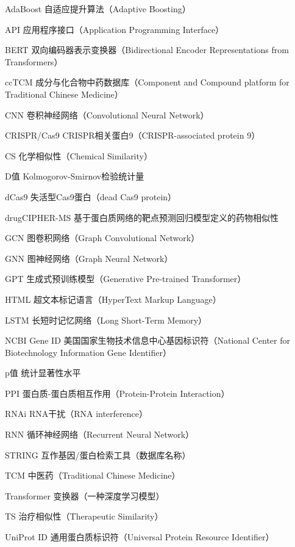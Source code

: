 
\begin{denotation}[3cm]
  \item[AdaBoost]{自适应提升算法（Adaptive Boosting）}
  \item[API]{应用程序接口（Application Programming Interface）}
  \item[BERT]{双向编码器表示变换器（Bidirectional Encoder Representations from Transformers）}
  \item[ccTCM]{成分与化合物中药数据库（Component and Compound platform for Traditional Chinese Medicine）}
  \item[CNN]{卷积神经网络（Convolutional Neural Network）}
  \item[CRISPR/Cas9]{CRISPR相关蛋白9（CRISPR-associated protein 9）}
  \item[CS]{化学相似性（Chemical Similarity）}
  \item[D值]{Kolmogorov-Smirnov检验统计量}
  \item[dCas9]{失活型Cas9蛋白（dead Cas9 protein）}
  \item[drugCIPHER-MS]{基于蛋白质网络的靶点预测回归模型定义的药物相似性}
  \item[GCN]{图卷积网络（Graph Convolutional Network）}
  \item[GNN]{图神经网络（Graph Neural Network）}
  \item[GPT]{生成式预训练模型（Generative Pre-trained Transformer）}
  \item[HTML]{超文本标记语言（HyperText Markup Language）}
  \item[LSTM]{长短时记忆网络（Long Short-Term Memory）}
  \item[NCBI Gene ID]{美国国家生物技术信息中心基因标识符（National Center for Biotechnology Information Gene Identifier）}
  \item[p值]{统计显著性水平}
  \item[PPI]{蛋白质-蛋白质相互作用（Protein-Protein Interaction）}
  \item[RNAi]{RNA干扰（RNA interference）}
  \item[RNN]{循环神经网络（Recurrent Neural Network）}
  \item[STRING]{互作基因/蛋白检索工具（数据库名称）}
  \item[TCM]{中医药（Traditional Chinese Medicine）}
  \item[Transformer]{变换器（一种深度学习模型）}
  \item[TS]{治疗相似性（Therapeutic Similarity）}
  \item[UniProt ID]{通用蛋白质标识符（Universal Protein Resource Identifier）}
\end{denotation}

